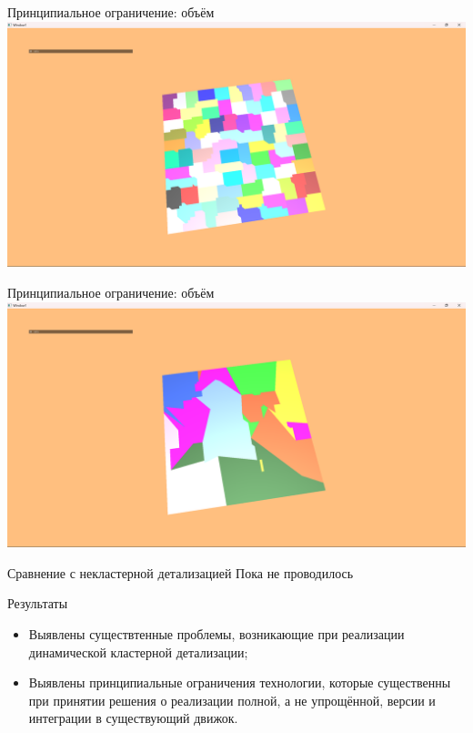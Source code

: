 \documentclass{beamer}
\begin{document}
    \begin{frame}{Принципиальное ограничение: объём}
        \includegraphics[width=\textwidth]{plane0.png}
    \end{frame}

    \begin{frame}{Принципиальное ограничение: объём}
        \includegraphics[width=\textwidth]{plane1.png}
    \end{frame}

    \begin{frame}{Сравнение с некластерной детализацией}
        Пока не проводилось
    \end{frame}

    \begin{frame}{Результаты}
        \begin{itemize}
            \item Выявлены существтенные проблемы,
            возникающие при реализации
            динамической кластерной детализации;

            \item Выявлены принципиальные
            ограничения технологии,
            которые существенны при принятии решения
            о реализации полной, а не упрощённой,
            версии и интеграции в существующий движок.
        \end{itemize}
    \end{frame}
\end{document}
